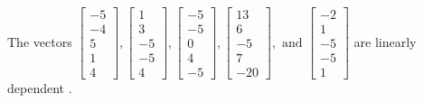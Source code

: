 \begin{exercise}
\begin{exerciseStatement}
  \end{exerciseStatement}
  \begin{exerciseAnswer}
   The vectors \(\left[\begin{array}{r}
-5 \\
-4 \\
5 \\
1 \\
4
\end{array}\right] , \left[\begin{array}{r}
1 \\
3 \\
-5 \\
-5 \\
4
\end{array}\right] , \left[\begin{array}{r}
-5 \\
-5 \\
0 \\
4 \\
-5
\end{array}\right] , \left[\begin{array}{r}
13 \\
6 \\
-5 \\
7 \\
-20
\end{array}\right] , \text{ and } \left[\begin{array}{r}
-2 \\
1 \\
-5 \\
-5 \\
1
\end{array}\right]\) are 
  	 linearly dependent  .
  


  \end{exerciseAnswer}
\end{exercise}